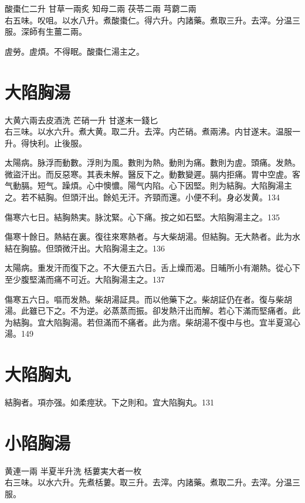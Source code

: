 酸棗仁{\scriptsize 二升} 甘草{\scriptsize 一兩炙} 知母{\scriptsize 二兩} 茯苓{\scriptsize 二兩} 芎藭{\scriptsize 二兩}\\
右五味。㕮咀。以水八升。煮酸棗仁。得六升。内諸藥。煮取三升。去滓。分温三服。{\scriptsize 深師有生薑二兩。}

虗勞。虗煩。不得眠。酸棗{\khaaitp 仁}湯主之。

\section{大陷胸湯}

大黄{\scriptsize 六兩去皮酒洗} 芒硝{\scriptsize 一升} 甘遂末{\scriptsize 一錢匕}\\
右三味。以水六升。煮大黄。取二升。去滓。内芒硝。煮兩沸。内甘遂末。温服一升。得快利。止後服。

太陽病。脉浮而動數。浮則为風。數則为熱。動則为痛。數則为虗。頭痛。发熱。微盜汗出。而反惡寒。其表未解。醫反下之。動數變遲。膈内拒痛。胃中空虗。客气動膈。短气。躁煩。心中懊憹。陽气内陷。心下因堅。則为結胸。大陷胸湯主之。若不結胸。但頭汗出。餘処无汗。齐頸而還。小便不利。身必发黄。134

傷寒六七日。結胸熱実。脉沈緊。心下痛。按之如石堅。大陷胸湯主之。135

傷寒十餘日。熱結在裏。復往來寒熱者。与大柴胡湯。但結胸。无大熱者。此为水結在胸脇。{\khaaitp 但}頭微汗出。大陷胸湯主之。136

太陽病。重发汗而復下之。不大便五六日。舌上燥而渴。日晡所小有潮熱。從心下至少腹堅滿而痛不可近。大陷胸湯主之。137

傷寒五六日。嘔而发熱。柴胡湯証具。而以他藥下之。柴胡証仍在者。復与柴胡湯。此雖已下之。不为逆。必蒸蒸而振。卻发熱汗出而解。若心下滿而堅痛者。此为結胸。宜大陷胸湯。若但滿而不痛者。此为痞。柴胡{\khaaitp 湯}不復中与也。宜半夏瀉心湯。149

\section{大陷胸丸}

結胸者。項亦强。如柔痙狀。下之則和。宜大陷胸丸。131

\section{小陷胸湯}

黄連{\scriptsize 一兩} 半夏{\scriptsize 半升洗} 栝蔞実{\scriptsize 大者一枚}\\
右三味。以水六升。先煮栝蔞。取三升。去滓。内諸藥。煮取二升。去滓。分温三服。

